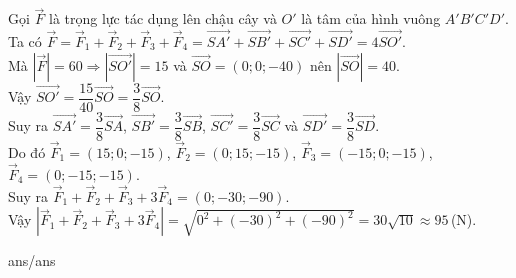 \begin{ex}
{ Gọi $\overrightarrow{F}$ là trọng lực tác dụng lên chậu cây và ${O}'$ là tâm của hình vuông $A'B'C'D'$.\\
 Ta có 
 $\overrightarrow{F}=\overrightarrow{F}_1+\overrightarrow{F}_2+\overrightarrow{F}_3+\overrightarrow{F}_4=\overrightarrow{SA'}+\overrightarrow{SB'}+\overrightarrow{SC'}+\overrightarrow{SD'}=4\overrightarrow{SO'}$.\\
 Mà $\left| \overrightarrow{F} \right|=60\Rightarrow \left| \overrightarrow{SO'} \right|=15$ và $\overrightarrow{SO}=(0;0;-40)$ nên $\left| \overrightarrow{SO} \right|=40$.\\
 Vậy $\overrightarrow{SO'}=\dfrac{15}{40}\overrightarrow{SO}=\dfrac{3}{8}\overrightarrow{SO}$.\\
 Suy ra
 $\overrightarrow{SA'}=\dfrac{3}{8}\overrightarrow{SA}$, 
 $\overrightarrow{SB'}=\dfrac{3}{8}\overrightarrow{SB}$, 
 $\overrightarrow{SC'}=\dfrac{3}{8}\overrightarrow{SC}$ và 
 $\overrightarrow{SD'}=\dfrac{3}{8}\overrightarrow{SD}$.\\
 Do đó $\overrightarrow{F}_1=(15;0;-15)$, $\overrightarrow{F}_2=(0;15;-15)$, $\overrightarrow{F}_3=(-15;0;-15)$, $\overrightarrow{F}_4=(0;-15;-15)$.\\
 Suy ra $\overrightarrow{F}_1+\overrightarrow{F}_2+\overrightarrow{F}_3+3\overrightarrow{F}_4=(0;-30;-90)$. \\
 Vậy $\left| \overrightarrow{F}_1+\overrightarrow{F}_2+\overrightarrow{F}_3+3\overrightarrow{F}_4 \right|=\sqrt{0^2+(-30)^2+(-90)^2}=30\sqrt{10}\approx 95$\,(N).
 }
\end{ex}
 
\begin{indapan}
	{ans/ans\currfilebase}
\end{indapan}

